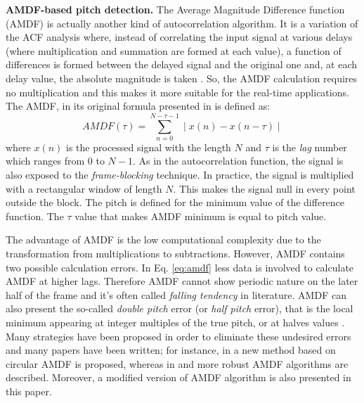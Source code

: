 \textbf{AMDF-based pitch detection.}
The Average Magnitude Difference function (AMDF) is actually another kind of autocorrelation algorithm. It is a variation of the ACF analysis where, instead of correlating the input signal at various delays (where multiplication and summation are formed at each value), a function of differences is formed between the delayed signal and the original one and, at each delay value, the absolute magnitude is taken \cite{tan2003pitch}. So, the AMDF calculation requires no multiplication and this makes it more suitable for the real-time applications. The AMDF, in its original formula presented in \cite{ross1974average} is defined as:
\newline
\begin{equation}
\label{eq:amdf} 
AMDF(\tau) = \sum_{n = 0}^{N - \tau - 1} \mid x(n) - x(n - \tau) \mid
\end{equation}
\newline
where $x(n)$ is the processed signal with the length $N$ and $\tau$ is the \emph{lag} number which ranges from $0$ to $N - 1$. As in the autocorrelation function, the signal is also exposed to the \emph{frame-blocking} technique. In practice, the signal is multiplied with a rectangular window of length $N$. This makes the signal null in every point outside the block. The pitch is defined for the minimum value of the difference function. The $\tau$ value that makes AMDF minimum is equal to pitch value.

The advantage of AMDF is the low computational complexity due to the transformation from multiplications to subtractions. However, AMDF contains two possible calculation errors. In Eq. \ref{eq:amdf} less data is involved to calculate AMDF at higher lags. Therefore AMDF cannot show periodic nature on the later half of the frame and it's often called \emph{falling tendency} in literature. AMDF can also present the so-called \emph{double pitch} error (or \emph{half pitch} error), that is the local minimum appearing at integer multiples of the true pitch, or at halves values \cite{muhammad2008noise}. Many strategies have been proposed in order to eliminate these undesired errors and many papers have been written; for instance, in \cite{zhang2002pitch} a new method based on circular AMDF is proposed, whereas in \cite{muhammad2008noise} and \cite{abdullah2009high} more robust AMDF algorithms are described.
Moreover, a modified version of AMDF algorithm is also presented in this paper. 

